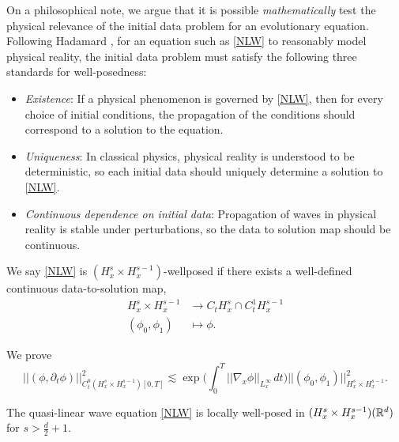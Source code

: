 On a philosophical note, we argue that it is possible \textit{mathematically} test the physical relevance of the initial data problem for an evolutionary equation. Following Hadamard \cite{hadamard}, for an equation such as \eqref{NLW} to reasonably model physical reality, the initial data problem must satisfy the following three standards for well-posedness: 
\begin{itemize}
	\item \textit{Existence}: If a physical phenomenon is governed by \eqref{NLW}, then for every choice of initial conditions, the propagation of the conditions should correspond to a solution to the equation. 
	
	\item \textit{Uniqueness}: In classical physics, physical reality is understood to be deterministic, so each initial data should uniquely determine a solution to \eqref{NLW}.

	\item \textit{Continuous dependence on initial data}: Propagation of waves in physical reality is stable under perturbations, so the data to solution map should be continuous. 
\end{itemize}
We say \eqref{NLW} is $(H^s_x \times H^{s - 1}_x)$-wellposed if there exists a well-defined continuous data-to-solution map, 
\begin{align*}
	H^s_x \times H^{s - 1}_x
		&\longrightarrow C_t H^s_x \cap C^1_t H^{s  -1}_x\\
	(\phi_0, \phi_1)
		&\longmapsto \phi.
\end{align*}


\begin{theorem}
	We prove 
	\begin{equation}
		||(\phi, \partial_t \phi)||_{C^0_t (H^s_x \times H^{s - 1}_x) [0, T]}^2
			\lesssim \exp \Big( \int_0^T ||\nabla_x \phi||_{L^\infty_x}\, dt \Big) ||(\phi_0,  \phi_1)||_{H^s_x \times H^{s - 1}_x}^2.
	\end{equation}
\end{theorem}


\begin{theorem}
	The quasi-linear wave equation \eqref{NLW} is locally well-posed in $(H^s_x \times H^{s - 1}_x)(\mathbb R^d)$ for $s > \tfrac{d}2 + 1$.
\end{theorem}